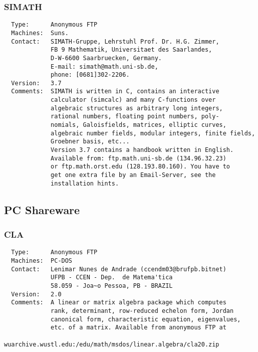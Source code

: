 \subsubsection{SIMATH}
\begin{verbatim}
  Type:      Anonymous FTP
  Machines:  Suns.
  Contact:   SIMATH-Gruppe, Lehrstuhl Prof. Dr. H.G. Zimmer,
             FB 9 Mathematik, Universitaet des Saarlandes,
             D-W-6600 Saarbruecken, Germany.
             E-mail: simath@math.uni-sb.de,
             phone: [0681]302-2206.
  Version:   3.7
  Comments:  SIMATH is written in C, contains an interactive
             calculator (simcalc) and many C-functions over
             algebraic structures as arbitrary long integers,
             rational numbers, floating point numbers, poly-
             nomials, Galoisfields, matrices, elliptic curves,
             algebraic number fields, modular integers, finite fields,
             Groebner basis, etc...
             Version 3.7 contains a handbook written in English.
             Available from: ftp.math.uni-sb.de (134.96.32.23)
             or ftp.math.orst.edu (128.193.80.160). You have to
             get one extra file by an Email-Server, see the
             installation hints.
\end{verbatim}


\subsection{PC Shareware}

\subsubsection{CLA}
\begin{verbatim}
  Type:      Anonymous FTP
  Machines:  PC-DOS
  Contact:   Lenimar Nunes de Andrade (ccendm03@brufpb.bitnet)
             UFPB - CCEN - Dep.  de Matema'tica
             58.059 - Joa~o Pessoa, PB - BRAZIL
  Version:   2.0
  Comments:  A linear or matrix algebra package which computes
             rank, determinant, row-reduced echelon form, Jordan
             canonical form, characteristic equation, eigenvalues,
             etc. of a matrix. Available from anonymous FTP at
             wuarchive.wustl.edu:/edu/math/msdos/linear.algebra/cla20.zip
\end{verbatim}

